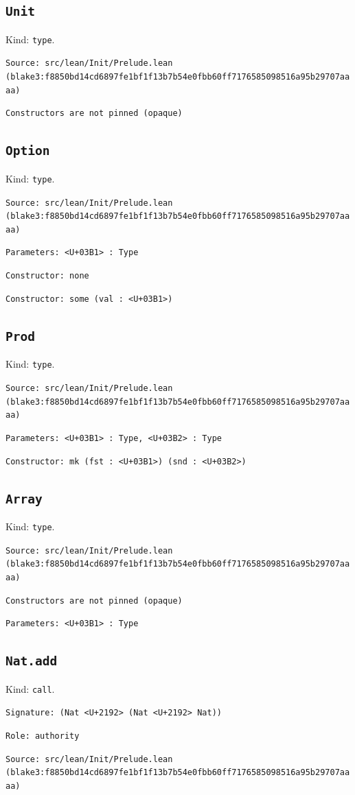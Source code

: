 \documentclass[11pt]{article}
\begin{document}
\subsection*{\texttt{Unit}}
\noindent Kind: \texttt{type}.\par
\noindent \texttt{Source: src/lean/Init/Prelude.lean (blake3:f8850bd14cd6897fe1bf1f13b7b54e0fbb60ff7176585098516a95b29707aaaa)}\par
\noindent \texttt{Constructors are not pinned (opaque)}\par
\subsection*{\texttt{Option}}
\noindent Kind: \texttt{type}.\par
\noindent \texttt{Source: src/lean/Init/Prelude.lean (blake3:f8850bd14cd6897fe1bf1f13b7b54e0fbb60ff7176585098516a95b29707aaaa)}\par
\noindent \texttt{Parameters: <U+03B1> : Type}\par
\noindent \texttt{Constructor: none }\par
\noindent \texttt{Constructor: some (val : <U+03B1>)}\par
\subsection*{\texttt{Prod}}
\noindent Kind: \texttt{type}.\par
\noindent \texttt{Source: src/lean/Init/Prelude.lean (blake3:f8850bd14cd6897fe1bf1f13b7b54e0fbb60ff7176585098516a95b29707aaaa)}\par
\noindent \texttt{Parameters: <U+03B1> : Type, <U+03B2> : Type}\par
\noindent \texttt{Constructor: mk (fst : <U+03B1>) (snd : <U+03B2>)}\par
\subsection*{\texttt{Array}}
\noindent Kind: \texttt{type}.\par
\noindent \texttt{Source: src/lean/Init/Prelude.lean (blake3:f8850bd14cd6897fe1bf1f13b7b54e0fbb60ff7176585098516a95b29707aaaa)}\par
\noindent \texttt{Constructors are not pinned (opaque)}\par
\noindent \texttt{Parameters: <U+03B1> : Type}\par
\subsection*{\texttt{Nat.add}}
\noindent Kind: \texttt{call}.\par
\noindent \texttt{Signature: (Nat <U+2192> (Nat <U+2192> Nat))}\par
\noindent \texttt{Role: authority}\par
\noindent \texttt{Source: src/lean/Init/Prelude.lean (blake3:f8850bd14cd6897fe1bf1f13b7b54e0fbb60ff7176585098516a95b29707aaaa)}\par
\end{document}
